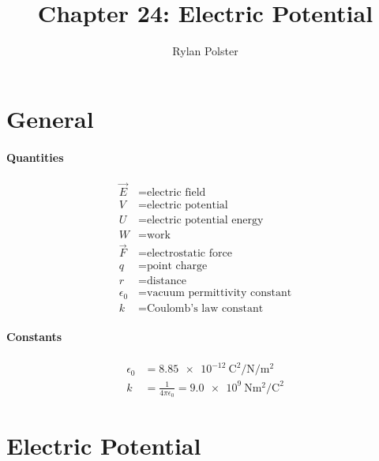 \documentclass{article}
\title{Chapter 24: Electric Potential}
\author{Rylan Polster}
\begin{document}
    \maketitle
    
    \section*{General}

        \paragraph{Quantities}
        \begin{align}
            \vec{E} &= \text{electric field} \nonumber\\
            V &= \text{electric potential} \nonumber\\
            U &= \text{electric potential energy} \nonumber\\
            W &= \text{work} \nonumber\\
            \vec{F} &= \text{electrostatic force} \nonumber\\
            q &= \text{point charge} \nonumber\\
            r &= \text{distance} \nonumber\\
            \epsilon_0 &= \text{vacuum permittivity constant} \nonumber\\
            k &= \text{Coulomb's law constant} \nonumber
        \end{align}

        \paragraph{Constants}
        \begin{align}
            \epsilon_0 &= \SI[per-mode=fraction]{8.85e-12}{\coulomb\squared\per\newton\per\meter\squared} \nonumber\\
            k &= \frac{1}{4 \pi \epsilon_0} = \SI[per-mode=fraction]{9.0e9}{\newton\meter\squared\per\square\coulomb} \nonumber
        \end{align}

    \section{Electric Potential}
\end{document}
